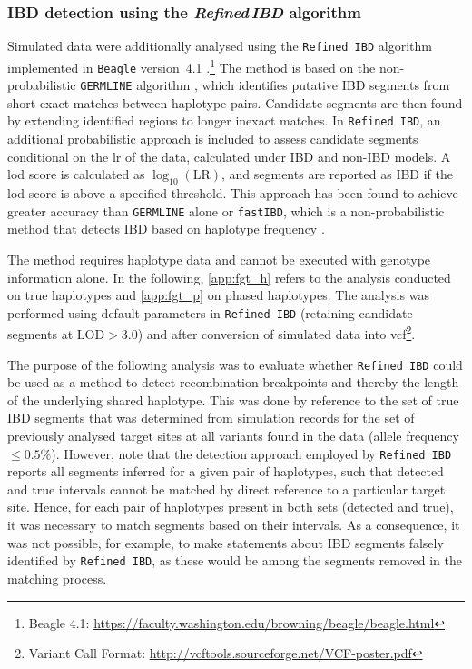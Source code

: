 %
\subsubsection{IBD detection using the \emph{Refined\,IBD} algorithm}
\label{sec:ibd_beagle_tru}
%


Simulated data were additionally analysed using the \texttt{Refined\,IBD} algorithm implemented in \texttt{Beagle} version~4.1 \citep{Browning:2013eh}.\footnote{Beagle 4.1: \url{https://faculty.washington.edu/browning/beagle/beagle.html} }
The method is based on the non-probabilistic \texttt{GERMLINE} algorithm \citep{Gusev:2009hd}, which identifies putative IBD segments from short exact matches between haplotype pairs.
Candidate segments are then found by extending identified regions to longer inexact matches.
In \texttt{Refined\,IBD}, an additional probabilistic approach is included to assess candidate segments conditional on the \gls{lr} of the data, calculated under IBD and non-IBD models.
A \gls{lod} score is calculated as ${\log_{10}(\text{LR})}$, and segments are reported as IBD if the \gls{lod} score is above a specified threshold.
This approach has been found to achieve greater accuracy than \texttt{GERMLINE} alone or \texttt{fastIBD}, which is a non-probabilistic method that detects IBD based on haplotype frequency \citep{Browning:2011do,Browning:2013eh}.

The method requires haplotype data and cannot be executed with genotype information alone.
In the following, \cref{app:fgt_h} refers to the analysis conducted on true haplotypes and \cref{app:fgt_p} on phased haplotypes.
The analysis was performed using default parameters in \texttt{Refined\,IBD} (retaining candidate segments at ${\mbox{LOD}>3.0}$) and after conversion of simulated data into \gls{vcf}\footnote{Variant Call Format: \url{http://vcftools.sourceforge.net/VCF-poster.pdf} }.


The purpose of the following analysis was to evaluate whether \texttt{Refined\,IBD} could be used as a method to detect recombination breakpoints and thereby the length of the underlying shared haplotype.
This was done by reference to the set of true IBD segments that was determined from simulation records for the set of previously analysed target sites at all \fk{[2,25]} variants found in the data (allele frequency $\leq 0.5\%$).
However, note that the detection approach employed by \texttt{Refined\,IBD} reports all segments inferred for a given pair of haplotypes, such that detected and true intervals cannot be matched by direct reference to a particular target site.
Hence, for each pair of haplotypes present in both sets (detected and true), it was necessary to match segments based on their intervals.
As a consequence, it was not possible, for example, to make statements about IBD segments falsely identified by \texttt{Refined\,IBD}, as these would be among the segments removed in the matching process.

